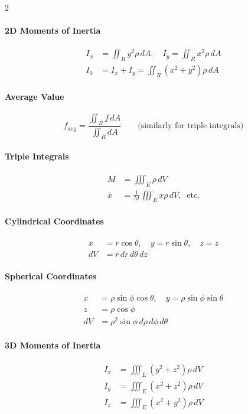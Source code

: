 \begin{multicols}{2}
\paragraph{2D Moments of Inertia}
\begin{align*}
I_x &= \iint_R y^2\rho\,dA, \quad I_y = \iint_R x^2\rho\,dA \\
I_0 &= I_x + I_y = \iint_R (x^2+y^2)\rho\,dA
\end{align*}

\paragraph{Average Value}
\[
f_{\text{avg}} = \frac{\iint_R f\,dA}{\iint_R dA} \qquad \text{(similarly for triple integrals)}
\]

\paragraph{Triple Integrals}
\begin{align*}
M &= \iiint_E \rho\,dV \\
\bar{x} &= \frac{1}{M}\iiint_E x\rho\,dV, \;\;\text{etc.}
\end{align*}

\paragraph{Cylindrical Coordinates}
\begin{align*}
x &= r\cos\theta, \quad y = r\sin\theta, \quad z = z \\
dV &= r\,dr\,d\theta\,dz
\end{align*}

\paragraph{Spherical Coordinates}
\begin{align*}
x &= \rho\sin\phi\cos\theta, \quad y = \rho\sin\phi\sin\theta \\
z &= \rho\cos\phi \\
dV &= \rho^2\sin\phi\,d\rho\,d\phi\,d\theta
\end{align*}

\paragraph{3D Moments of Inertia}
\begin{align*}
I_x &= \iiint_E (y^2+z^2)\rho\,dV \\
I_y &= \iiint_E (x^2+z^2)\rho\,dV \\
I_z &= \iiint_E (x^2+y^2)\rho\,dV
\end{align*}


\end{multicols}
